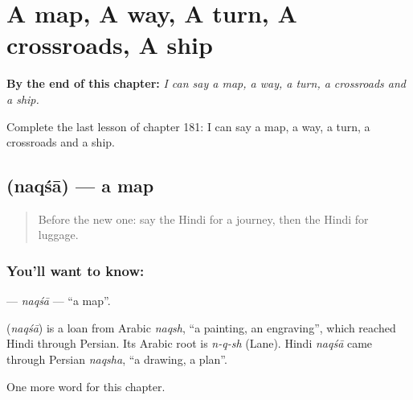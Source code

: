 
\chapter{A map, A way, A turn, A crossroads, A ship}
\label{ch:hi-a-map-a-way-a-turn-a-crossroads-a-ship}

\begin{chapteropening}
\textbf{By the end of this chapter:} \emph{I can say a map, a way, a turn, a crossroads and a ship.}

Complete the last lesson of chapter 181: I can say a map, a way, a turn, a crossroads and a ship.
\end{chapteropening}

\section[\texorpdfstring{\hi{नक़्शा} (naqśā)}{नक़्शा (naqśā)}]{ (naqśā) — a map}

\label{lesson:HI-C181-naqsa}



\begin{quote}
Before the new one: say the Hindi for a journey, then the Hindi for luggage.
\end{quote}

\subsection*{You'll want to know: }
\textbf{} — \emph{naqśā} — \textquotedblleft{}a map\textquotedblright{}.

\begin{cousinweb}
\textbf{} (\emph{naqśā}) is a loan from Arabic \emph{naqsh}, \textquotedblleft{}a painting, an engraving\textquotedblright{}, which reached Hindi through Persian. Its Arabic root is \emph{n-q-sh} (Lane). Hindi \emph{naqśā} came through Persian \emph{naqsha}, \textquotedblleft{}a drawing, a plan\textquotedblright{}.
\end{cousinweb}

\begin{grammarlens}[title={What you've built}]
One more word for this chapter.
\end{grammarlens}

